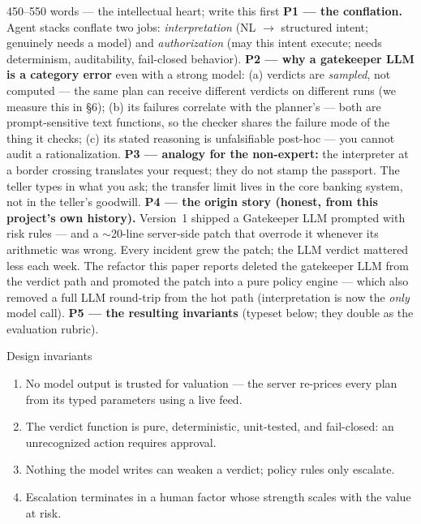 \documentclass[11pt,a4paper]{article}
\begin{document}
\begin{towrite}{450--550 words — the intellectual heart; write this first}
\textbf{P1 — the conflation.} Agent stacks conflate two jobs: \emph{interpretation}
(NL $\to$ structured intent; genuinely needs a model) and \emph{authorization}
(may this intent execute; needs determinism, auditability, fail-closed behavior).
\textbf{P2 — why a gatekeeper LLM is a category error} even with a strong model:
(a) verdicts are \emph{sampled}, not computed — the same plan can receive
different verdicts on different runs (we measure this in §6); (b) its failures
correlate with the planner's — both are prompt-sensitive text functions, so the
checker shares the failure mode of the thing it checks; (c) its stated reasoning
is unfalsifiable post-hoc — you cannot audit a rationalization.
\textbf{P3 — analogy for the non-expert:} the interpreter at a border crossing
translates your request; they do not stamp the passport. The teller types in
what you ask; the transfer limit lives in the core banking system, not in the
teller's goodwill.
\textbf{P4 — the origin story (honest, from this project's own history).}
Version~1 shipped a Gatekeeper LLM prompted with risk rules — and a
$\sim$20-line server-side patch that overrode it whenever its arithmetic was
wrong. Every incident grew the patch; the LLM verdict mattered less each week.
The refactor this paper reports deleted the gatekeeper LLM from the verdict path
and promoted the patch into a pure policy engine — which also removed a full LLM
round-trip from the hot path (interpretation is now the \emph{only} model call).
\textbf{P5 — the resulting invariants} (typeset below; they double as the
evaluation rubric).
\end{towrite}

\begin{keybox}{Design invariants}
\sffamily\small
\begin{enumerate}[leftmargin=6mm,itemsep=0.5mm]
  \item No model output is trusted for valuation — the server re-prices every plan from its typed parameters using a live feed.
  \item The verdict function is pure, deterministic, unit-tested, and fail-closed: an unrecognized action requires approval.
  \item Nothing the model writes can weaken a verdict; policy rules only escalate.
  \item Escalation terminates in a human factor whose strength scales with the value at risk.
\end{enumerate}
\end{keybox}
\end{document}
